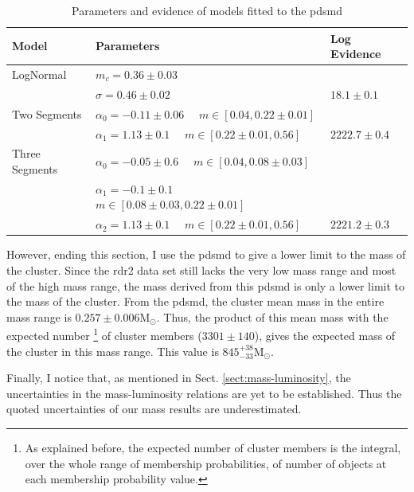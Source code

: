 \begin{table}[ht!]
\caption{Parameters and evidence of models fitted to the \gls{pdsmd}}
\begin{center}
\begin{tabular}{lll}
Model&Parameters& Log Evidence\\
\hline
LogNormal&$m_c=0.36\pm0.03$&\\
                 &$\sigma=0.46\pm0.02$ & $18.1 \pm 0.1$\\
\hline
Two Segments &$\alpha_0=-0.11\pm0.06$ \ \ $m \in [0.04,0.22\pm0.01]$ & \\ 
&  $\alpha_1=1.13\pm0.1$ \ \ $m \in [0.22\pm0.01,0.56]$&$2222.7\pm0.4$\\
\hline
Three Segments &$\alpha_0=-0.05\pm0.6$ \ \ $m \in [0.04,0.08\pm0.03]$ & \\
                          &$\alpha_1=-0.1\pm0.1$ \ \ $m \in [0.08\pm0.03,0.22\pm0.01]$ & \\ 
                          &$\alpha_2=1.13\pm0.1$ \ \ $m \in [0.22\pm0.01,0.56]$&$2221.2\pm 0.3$\\
\hline
\end{tabular}
\end{center}
\label{tab:fitPDSMD}
\end{table}%

However, ending this section, I use the \gls{pdsmd} to give a lower limit to the mass of the cluster. Since the \gls{rdr2} data set  still lacks the very low mass range and most of the high mass range, the mass derived from this \gls{pdsmd} is only a lower limit to the mass of the cluster. From the \gls{pdsmd}, the cluster mean mass in the entire mass range is $0.257 \pm 0.006 \mathrm{M_{\odot}}$. Thus, the product of this mean mass with the expected number \footnote{As explained before, the expected number of cluster members is the integral, over the whole range of membership probabilities, of number of objects at each membership probability value.} of cluster members ($3301 \pm 140$), gives the expected mass of the cluster in this mass range. This  value is $845^{+38}_{-33} \mathrm{M_{\odot}}$. 

Finally, I notice that, as mentioned in Sect. \ref{sect:mass-luminosity}, the uncertainties in the mass-luminosity relations are yet to be established. Thus the quoted uncertainties of our mass results are underestimated.

